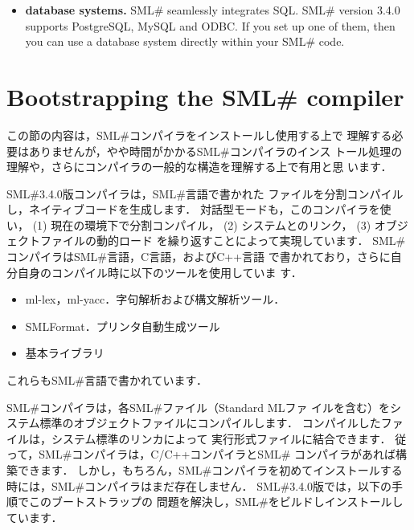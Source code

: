 \documentclass{jbook}
\newcommand{\txt}[2]{#2}
\newcommand{\smlsharp}{SML\#}
\newcommand{\version}{3.4.0}
\begin{document}
\begin{itemize}
	If your purpose is to make a small program entirely within
\smlsharp{}, then you will not need to invoke a C compiler directly.
	However, if you want to make a practical program, you may want to
call some system library functions or you may write some part of your
system in C and call that function from your ML code.
	This is straightforward in \smlsharp{}.
	To exploit this feature, we recommend that you familiarize
yourself with C compiler.

\item {\bf database systems.}
	\smlsharp{} seamlessly integrates SQL.
	\smlsharp{} version \version{} supports PostgreSQL, MySQL and ODBC.
	If you set up one of them, then you can use a database system
directly within your \smlsharp{} code.
\end{itemize}

\fi%


\section{
\txt{\smlsharp{}コンパイラの構造とブートストラップ}
    {Bootstrapping the \smlsharp{} compiler}
}
\label{sec:tutorialBootstrap}

\ifjp%
	この節の内容は，\smlsharp{}コンパイラをインストールし使用する上で
理解する必要はありませんが，やや時間がかかる\smlsharp{}コンパイラのインス
トール処理の理解や，さらにコンパイラの一般的な構造を理解する上で有用と思
います．

	\smlsharp{}\version{}版コンパイラは，\smlsharp{}言語で書かれた
ファイルを分割コンパイルし，ネイティブコードを生成します．
	対話型モードも，このコンパイラを使い，
(1) 現在の環境下で分割コンパイル，
(2) システムとのリンク，
(3) オブジェクトファイルの動的ロード
を繰り返すことによって実現しています．
	\smlsharp{}コンパイラは\smlsharp{}言語，C言語，およびC++言語
で書かれており，さらに自分自身のコンパイル時に以下のツールを使用していま
す．
\begin{itemize}
\item ml-lex，ml-yacc．字句解析および構文解析ツール．
\item SMLFormat．プリンタ自動生成ツール
\item 基本ライブラリ
\end{itemize}
	これらも\smlsharp{}言語で書かれています．

	\smlsharp{}コンパイラは，各\smlsharp{}ファイル（Standard MLファ
イルを含む）をシステム標準のオブジェクトファイルにコンパイルします．
	コンパイルしたファイルは，システム標準のリンカによって
実行形式ファイルに結合できます．
	従って，\smlsharp{}コンパイラは，C/C++コンパイラと\smlsharp{}
コンパイラがあれば構築できます．
	しかし，もちろん，\smlsharp{}コンパイラを初めてインストールする
時には，\smlsharp{}コンパイラはまだ存在しません．
	\smlsharp{}\version{}版では，以下の手順でこのブートストラップの
問題を解決し，\smlsharp{}をビルドしインストールしています．
\end{document}
